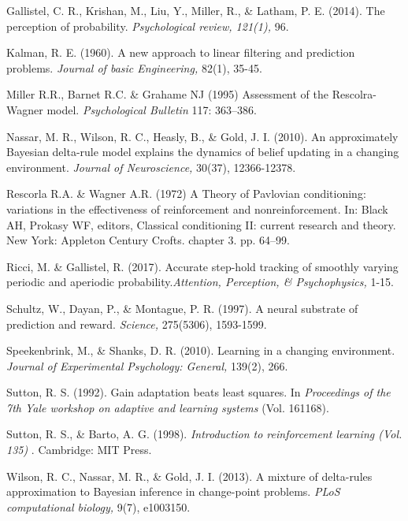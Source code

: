 \documentclass[jou,apacite]{apa6}
\begin{document}
\begin{hangparas}{.3in}{1}

Gallistel, C. R., Krishan, M., Liu, Y., Miller, R., \& Latham, P. E. (2014). The perception of probability. {\it Psychological review, 121(1),} 96.

Kalman, R. E. (1960). A new approach to linear filtering and prediction problems. {\it Journal of basic Engineering,} 82(1), 35-45.

Miller R.R., Barnet R.C. \& Grahame NJ (1995) Assessment of the Rescolra-Wagner model. {\it Psychological Bulletin} 117: 363–386.

Nassar, M. R., Wilson, R. C., Heasly, B., \& Gold, J. I. (2010). An approximately Bayesian delta-rule model explains the dynamics of belief updating in a changing environment. {\it Journal of Neuroscience,} 30(37), 12366-12378.

Rescorla R.A. \& Wagner A.R. (1972) A Theory of Pavlovian conditioning: variations in the effectiveness of reinforcement and nonreinforcement. In: Black AH, Prokasy WF, editors, Classical conditioning II: current research and theory. New York: Appleton Century Crofts. chapter 3. pp. 64–99. 

Ricci, M. \& Gallistel, R. (2017). Accurate step-hold tracking of smoothly varying periodic and aperiodic probability.{\it Attention, Perception, \& Psychophysics, }1-15.

Schultz, W., Dayan, P., \& Montague, P. R. (1997). A neural substrate of prediction and reward. {\it Science,} 275(5306), 1593-1599.

Speekenbrink, M., \& Shanks, D. R. (2010). Learning in a changing environment. {\it Journal of Experimental Psychology: General,} 139(2), 266.

Sutton, R. S. (1992). Gain adaptation beats least squares. In {\it Proceedings of the 7th Yale workshop on adaptive and learning systems} (Vol. 161168).

Sutton, R. S., \& Barto, A. G. (1998). {\it Introduction to reinforcement learning (Vol. 135)} . Cambridge: MIT Press.

Wilson, R. C., Nassar, M. R., \& Gold, J. I. (2013). A mixture of delta-rules approximation to Bayesian inference in change-point problems. {\it PLoS computational biology,} 9(7), e1003150.




\end{hangparas}


\onecolumn


\end{document}
